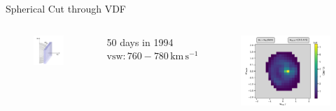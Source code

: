 \documentclass{beamer}
\begin{document}

\begin{frame}{Spherical Cut through VDF}
\begin{columns}
	\column{2.5cm}
\begin{figure}
	\includegraphics[scale=.7]{Pics/slice_R2.pdf}
\end{figure}
{\scriptsize 50 days in 1994 \\
 $\mathrm{vsw} : 760 - 780 \, \mathrm{km\,s^{-1}}$
}
\column{7.5cm}
\begin{figure}
	\includegraphics[scale=.5]{Pics/cart_50_counts_R.pdf}
\end{figure}
\end{columns}
\end{frame}
\end{document}
